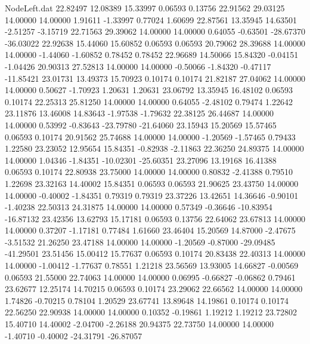 \begin{filecontents}{NodeLeft.dat}
  22.82497   12.08389   15.33997     0.06593    0.13756   22.91562   29.03125   14.00000   14.00000    1.91611   -1.33997    0.77024    1.60699
  22.87561   13.35945   14.63501    -2.51257   -3.15719   22.71563   29.39062   14.00000   14.00000    0.64055   -0.63501  -28.67370  -36.03022
  22.92638   15.44060   15.60852     0.06593    0.06593   20.79062   28.39688   14.00000   14.00000   -1.44060   -1.60852    0.78452    0.78452
  22.96689   14.50066   15.84320    -0.04151   -1.04426   20.90313   27.52813   14.00000   14.00000   -0.50066   -1.84320   -0.47117  -11.85421
  23.01731   13.49373   15.70923     0.10174    0.10174   21.82187   27.04062   14.00000   14.00000    0.50627   -1.70923    1.20631    1.20631
  23.06792   13.35945   16.48102     0.06593    0.10174   22.25313   25.81250   14.00000   14.00000    0.64055   -2.48102    0.79474    1.22642
  23.11876   13.46008   14.83643    -1.97538   -1.79632   22.38125   26.44687   14.00000   14.00000    0.53992   -0.83643  -23.79780  -21.64060
  23.15943   15.20569   15.57465     0.06593    0.10174   20.91562   25.74688   14.00000   14.00000   -1.20569   -1.57465    0.79433    1.22580
  23.23052   12.95654   15.84351    -0.82938   -2.11863   22.36250   24.89375   14.00000   14.00000    1.04346   -1.84351  -10.02301  -25.60351
  23.27096   13.19168   16.41388     0.06593    0.10174   22.80938   23.75000   14.00000   14.00000    0.80832   -2.41388    0.79510    1.22698
  23.32163   14.40002   15.84351     0.06593    0.06593   21.90625   23.43750   14.00000   14.00000   -0.40002   -1.84351    0.79319    0.79319
  23.37226   13.42651   14.36646    -0.90101   -1.40238   22.50313   24.31875   14.00000   14.00000    0.57349   -0.36646  -10.83954  -16.87132
  23.42356   13.62793   15.17181     0.06593    0.13756   22.64062   23.67813   14.00000   14.00000    0.37207   -1.17181    0.77484    1.61660
  23.46404   15.20569   14.87000    -2.47675   -3.51532   21.26250   23.47188   14.00000   14.00000   -1.20569   -0.87000  -29.09485  -41.29501
  23.51456   15.00412   15.77637     0.06593    0.10174   20.83438   22.40313   14.00000   14.00000   -1.00412   -1.77637    0.78551    1.21218
  23.56569   13.93005   14.66827    -0.00569    0.06593   21.55000   22.74063   14.00000   14.00000    0.06995   -0.66827   -0.06862    0.79461
  23.62677   12.25174   14.70215     0.06593    0.10174   23.29062   22.66562   14.00000   14.00000    1.74826   -0.70215    0.78104    1.20529
  23.67741   13.89648   14.19861     0.10174    0.10174   22.56250   22.90938   14.00000   14.00000    0.10352   -0.19861    1.19212    1.19212
  23.72802   15.40710   14.40002    -2.04700   -2.26188   20.94375   22.73750   14.00000   14.00000   -1.40710   -0.40002  -24.31791  -26.87057

\end{filecontents}
